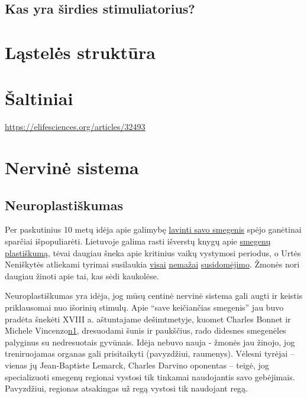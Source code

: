 \documentclass[]{book}
\begin{document}
\hypertarget{kas-yra-sirdies-stimuliatorius}{%
\section{Kas yra širdies stimuliatorius?}\label{kas-yra-sirdies-stimuliatorius}}

\hypertarget{lasteles-struktura}{%
\chapter{Ląstelės struktūra}\label{lasteles-struktura}}

\hypertarget{saltiniai-1}{%
\chapter{Šaltiniai}\label{saltiniai-1}}

\url{https://elifesciences.org/articles/32493}

\hypertarget{nervine-sistema}{%
\chapter{Nervinė sistema}\label{nervine-sistema}}

\hypertarget{neuroplastiskumas}{%
\section{Neuroplastiškumas}\label{neuroplastiskumas}}

Per paskutinius 10 metų idėja apie galimybę \href{https://trends.google.com/trends/explore?date=2004-05-20\%202019-06-20\&geo=US\&q=rewire\%20brain}{lavinti savo smegenis} spėjo ganėtinai sparčiai išpopuliarėti. Lietuvoje galima rasti išverstų knygų apie \href{https://kitosknygos.lt/knygos/Save-keiciancios-smegenys}{smegenų plastiškumą}, tėvai daugiau šneka apie kritinius vaikų vystymosi periodus, o Urtės Neniškytės atliekami tyrimai susilaukia \href{https://www.youtube.com/watch?v=WDF40W0QVn0}{visai} \href{https://www.youtube.com/watch?v=ezKhpOB7ZyE}{nemažai} \href{https://www.youtube.com/watch?v=9kXFrAyKs4U}{susidomėjimo}. Žmonės nori daugiau žinoti apie tai, kas sėdi kaukolėse.

Neuroplastiškumas yra idėja, jog mūsų centinė nervinė sistema gali augti ir keistis priklausomai nuo išorinių stimulų. Apie ``save keičiančias smegenis'' jau buvo pradėta šnekėti XVIII a. aštuntajame dešimtmetyje, kuomet Charles Bonnet ir Michele Vincenzo\href{Neuroplasticity,\%20MIT\%20Press,\%202016\%20m.}{n1}, dresuodami šunis ir paukščius, rado didesnes smegenėles palyginus su nedresuotais gyvūnais. Idėja nebuvo nauja - žmonės jau žinojo, jog treniruojamas organas gali prisitaikyti (pavyzdžiui, raumenys). Vėlesni tyrėjai -- vienas jų Jean-Baptiste Lemarck, Charles Darvino oponentas -- teigė, jog specializuoti smegenų regionai vystosi tik tinkamai naudojantis savo gebėjimais. Pavyzdžiui, regionas atsakingas už regą vystosi tik naudojant regą.
\end{document}

